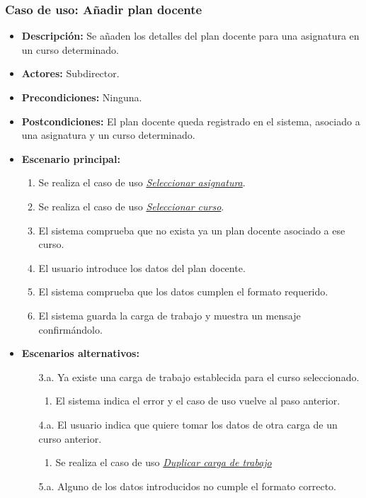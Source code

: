 \documentclass{book}
\begin{document}
\subsubsection*{Caso de uso: Añadir plan docente}
\begin{itemize}
\item{\bf Descripción:} Se añaden los detalles del plan docente para una asignatura en un curso determinado.
\item{\bf Actores:} Subdirector.
\item{\bf Precondiciones:} Ninguna.
\item{\bf Postcondiciones:} El plan docente queda registrado en el sistema, asociado a una asignatura y un curso determinado.
\item{\bf Escenario principal:}
	\begin{enumerate}
	\item Se realiza el caso de uso {\em \hyperref[select_asignatura]{Seleccionar asignatura}}.
	\item Se realiza el caso de uso {\em \hyperref[select_curso]{Seleccionar curso}}.
	\item El sistema comprueba que no exista ya un plan docente asociado a ese curso.
	\item El usuario introduce los datos del plan docente.
	\item El sistema comprueba que los datos cumplen el formato requerido.
	\item El sistema guarda la carga de trabajo y muestra un mensaje confirmándolo.
	\end{enumerate}
\item{\bf Escenarios alternativos:}
	\begin{itemize}
	\item[3.a.] Ya existe una carga de trabajo establecida para el curso seleccionado.
		\begin{enumerate}
		\item El sistema indica el error y el caso de uso vuelve al paso anterior.
		\end{enumerate}
	\item[4.a.] El usuario indica que quiere tomar los datos de otra carga de un curso anterior.
		\begin{enumerate}
		\item Se realiza el caso de uso {\em \hyperref[duplicar_carga]{Duplicar carga de trabajo}}
		\end{enumerate}
	\item[5.a.] Alguno de los datos introducidos no cumple el formato correcto.

\end{itemize}
\end{itemize}
\end{document}
